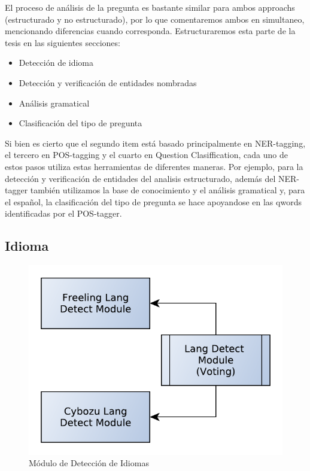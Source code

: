 El proceso de análisis de la pregunta es bastante similar para ambos approachs (estructurado y no estructurado), por lo
que comentaremos ambos en simultaneo, mencionando diferencias cuando corresponda. 
Estructuraremos esta parte de la tesis en las siguientes secciones:

\begin{itemize}
\item Detección de idioma 
\item Detección y verificación de entidades nombradas
\item Análisis gramatical
\item Clasificación del tipo de pregunta
\end{itemize}

Si bien es cierto que el segundo item está basado principalmente en NER-tagging, el tercero en POS-tagging y el cuarto en Question Clasiffication, 
cada uno de estos pasos utiliza estas herramientas de diferentes maneras. Por ejemplo, para la detección y verificación de entidades del analisis estructurado, además del NER-tagger también utilizamos la base de conocimiento y el análisis gramatical y, para el español, la clasificación del tipo de pregunta se hace apoyandose en las qwords identificadas por el POS-tagger.

\subsection{Idioma}

\begin{figure}
  \centering
    \includegraphics[scale=0.86]{graficos/LangDetect}
  \caption{Módulo de Detección de Idiomas}
  \label{fig:LangDetect}
\end{figure}


